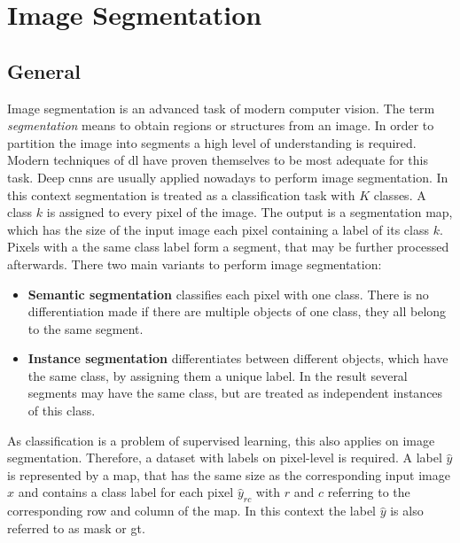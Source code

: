 
\section{Image Segmentation}\label{ord:ch2:sec2}

\subsection{General}\label{ord:ch2:sec2:subsec1}
Image segmentation is an advanced task of modern computer vision.
The term \emph{segmentation} means to obtain regions or structures from an image.
In order to partition the image into segments a high level of understanding is required.
Modern techniques of \gls{dl} have proven themselves to be most adequate for this task.
Deep \glspl{cnn} are usually applied nowadays to perform image segmentation.
In this context segmentation is treated as a classification task with $K$ classes.
A class $k$ is assigned to every pixel of the image.
The output is a segmentation map, which has the size of the input image each pixel containing a label of its class $k$. 
Pixels with a the same class label form a segment, that may be further processed afterwards.
There two main variants to perform image segmentation:
\begin{itemize}
	\item \textbf{Semantic segmentation} classifies each pixel with one class.
	There is no differentiation made if there are multiple objects of one class, they all belong to the same segment.
	\item \textbf{Instance segmentation} differentiates between different objects, which have the same class, by assigning them a unique label.
	In the result several segments may have the same class, but are treated as independent instances of this class.
\end{itemize}

As classification is a problem of supervised learning, this also applies on image segmentation.
Therefore, a dataset with labels on pixel-level is required.
A label $\hat{y}$ is represented by a map, that has the same size as the corresponding input image $x$ and contains a class label for each pixel $\hat{y}_{rc}$ with $r$ and $c$ referring to the corresponding row and column of the map. 
In this context the label $\hat{y}$ is also referred to as mask or \gls{gt}.

